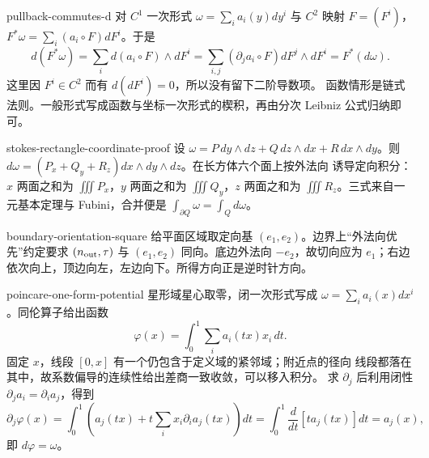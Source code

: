 \begin{solution}{pullback-commutes-d}
对 $C^1$ 一次形式 $\omega=\sum_i a_i(y)dy^i$ 与 $C^2$ 映射 $F=(F^i)$，
$F^*\omega=\sum_i(a_i\circ F)dF^i$。于是
\[
 d(F^*\omega)=\sum_i d(a_i\circ F)\wedge dF^i
 =\sum_{i,j}(\partial_ja_i\circ F)dF^j\wedge dF^i=F^*(d\omega).
\]
这里因 $F^i\in C^2$ 而有 $d(dF^i)=0$，所以没有留下二阶导数项。
函数情形是链式法则。一般形式写成函数与坐标一次形式的楔积，再由分次
Leibniz 公式归纳即可。
\end{solution}

\begin{solution}{stokes-rectangle-coordinate-proof}
设 $\omega=P\,dy\wedge dz+Q\,dz\wedge dx+R\,dx\wedge dy$。则
$d\omega=(P_x+Q_y+R_z)dx\wedge dy\wedge dz$。在长方体六个面上按外法向
诱导定向积分：$x$ 两面之和为 $\iiint P_x$，$y$ 两面之和为
$\iiint Q_y$，$z$ 两面之和为 $\iiint R_z$。三式来自一元基本定理与
Fubini，合并便是 $\int_{\partial Q}\omega=\int_Qd\omega$。
\end{solution}

\begin{solution}{boundary-orientation-square}
给平面区域取定向基 $(e_1,e_2)$。边界上“外法向优先”约定要求
$(n_{\rm out},\tau)$ 与 $(e_1,e_2)$ 同向。底边外法向 $-e_2$，故切向应为
$e_1$；右边依次向上，顶边向左，左边向下。所得方向正是逆时针方向。
\end{solution}

\begin{solution}{poincare-one-form-potential}
星形域星心取零，闭一次形式写成
$\omega=\sum_i a_i(x)dx^i$。同伦算子给出函数
\[
 \varphi(x)=\int_0^1\sum_i a_i(tx)x_i\,dt.
\]
固定 $x$，线段 $[0,x]$ 有一个仍包含于定义域的紧邻域；附近点的径向
线段都落在其中，故系数偏导的连续性给出差商一致收敛，可以移入积分。
求 $\partial_j$ 后利用闭性 $\partial_ja_i=\partial_i a_j$，得到
\[
 \partial_j\varphi(x)=\int_0^1\left(a_j(tx)+t\sum_i x_i\partial_i a_j(tx)\right)dt
 =\int_0^1\frac d{dt}[t a_j(tx)]dt=a_j(x),
\]
即
$d\varphi=\omega$。
\end{solution}


